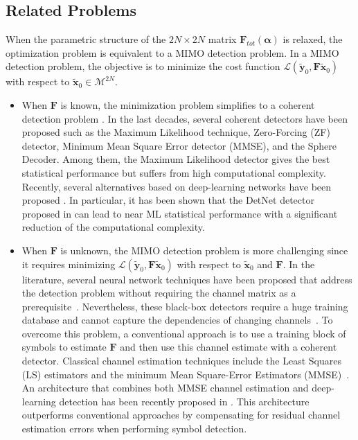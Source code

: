 \documentclass{article}
\begin{document}
\subsection{Related Problems}

When the parametric structure of the $2N\times 2N$ matrix $\mathbf{F}_{tot}(\boldsymbol \alpha)$ is relaxed, the optimization problem is equivalent to a MIMO detection problem. In a MIMO detection problem, the objective is to minimize the cost function $\mathcal{L}\left(\tilde{\mathbf{y}}_0, \mathbf{F}\tilde{\mathbf{x}}_{0}\right)$ with respect to $\tilde{\mathbf{x}}_{0}\in \mathcal{M}^{2N}$.

\begin{itemize}
\item When $\mathbf{F}$ is known, the minimization problem simplifies to a coherent detection problem \cite{LAR09}. In the last decades, several coherent detectors have been proposed such as the Maximum Likelihood technique, Zero-Forcing (ZF) detector, Minimum Mean Square Error detector (MMSE), and the Sphere Decoder. Among them, the Maximum Likelihood detector gives the best statistical performance but suffers from high computational complexity. Recently, several alternatives based on deep-learning networks have been proposed \cite{SA19,KHA20,SHL20}. In particular, it has been shown that the DetNet detector proposed in \cite{SA19} can lead to near ML statistical performance with a significant reduction of the computational complexity.
\item When $\mathbf{F}$ is unknown, the MIMO detection problem is more challenging since it requires minimizing $\mathcal{L}\left(\tilde{\mathbf{y}}_0, \mathbf{F}\tilde{\mathbf{x}}_{0}\right)$ with respect to $\tilde{\mathbf{x}}_{0}$ and $\mathbf{F}$. In the literature, several neural network techniques have been proposed that address the detection problem without requiring the channel matrix as a prerequisite~\cite{FAR18,SA19}. Nevertheless, these black-box detectors require a huge training database and cannot capture the dependencies of changing channels~\cite{SA19}. To overcome this problem, a conventional approach is to use a training block of symbols to estimate $\mathbf{F}$ and then use this channel estimate with a coherent detector. Classical channel estimation techniques include the Least Squares (LS) estimators and the minimum Mean Square-Error Estimators (MMSE)~\cite{BIG06}. An architecture that combines both MMSE channel estimation and deep-learning detection has been recently proposed in \cite{HE20}. This architecture outperforms conventional approaches by compensating for residual channel estimation errors when performing symbol detection.
\end{itemize}
\end{document}
